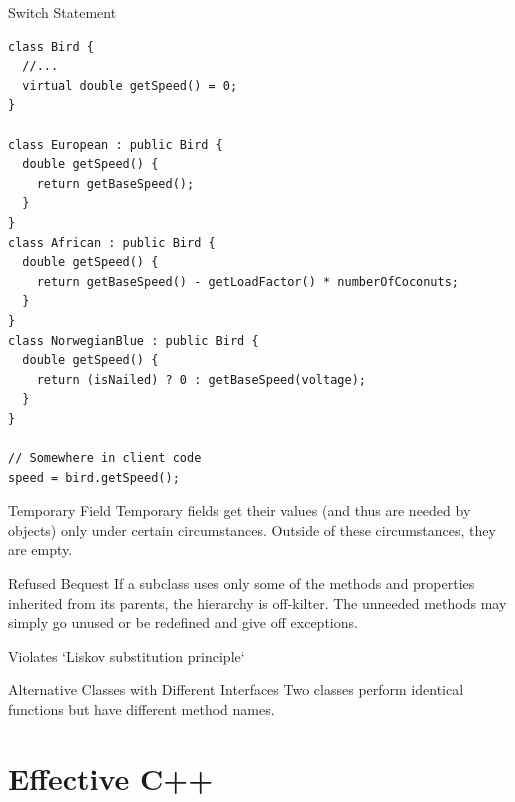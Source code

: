 \documentclass{beamer}
\begin{document}
\begin{frame}[fragile]{Switch Statement}
\begin{lstlisting}
class Bird {
  //...
  virtual double getSpeed() = 0;
}

class European : public Bird {
  double getSpeed() {
    return getBaseSpeed();
  }
}
class African : public Bird {
  double getSpeed() {
    return getBaseSpeed() - getLoadFactor() * numberOfCoconuts;
  }
}
class NorwegianBlue : public Bird {
  double getSpeed() {
    return (isNailed) ? 0 : getBaseSpeed(voltage);
  }
}

// Somewhere in client code
speed = bird.getSpeed();
\end{lstlisting}
\end{frame}

\begin{frame}{Temporary Field}
Temporary fields get their values (and thus are needed by objects) only under
certain circumstances. Outside of these circumstances, they are empty.
\end{frame}

\begin{frame}{Refused Bequest}
If a subclass uses only some of the methods and properties inherited from its
parents, the hierarchy is off-kilter. The unneeded methods may simply go unused
or be redefined and give off exceptions.

Violates `Liskov substitution principle` 
\end{frame}

\begin{frame}{Alternative Classes with Different Interfaces}
Two classes perform identical functions but have different method names.
\end{frame}

\section{Effective C++}
\end{document}
